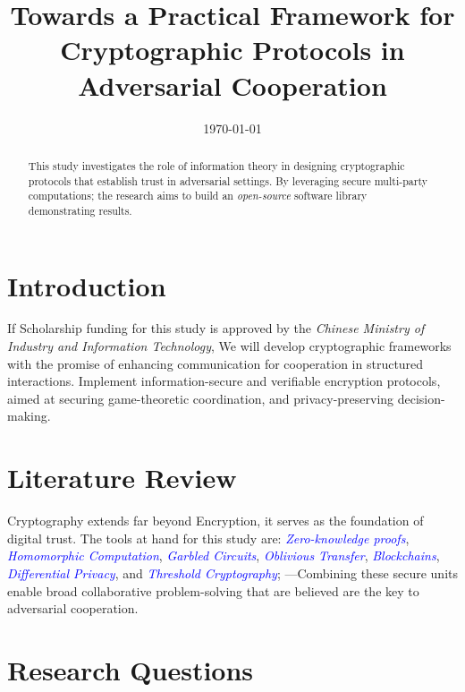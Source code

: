 \documentclass[conference]{IEEEtran}
\date{\today}
\begin{document}
\title{Towards a Practical Framework for Cryptographic Protocols in Adversarial Cooperation}
\author{
}

\maketitle

\begin{abstract}
This study investigates the role of information theory in designing cryptographic protocols that establish trust in adversarial settings. 
By leveraging secure multi-party computations; the research aims to build 
an \textit{open-source} software library demonstrating results.
\end{abstract}

\section{Introduction}
If Scholarship funding for this study is approved by the \textit{Chinese Ministry of Industry and Information Technology}, 
We will develop cryptographic frameworks with the promise of enhancing communication for cooperation in structured interactions. 
Implement information-secure and verifiable encryption protocols, aimed at securing game-theoretic coordination, and privacy-preserving decision-making.

\section{Literature Review}
Cryptography extends far beyond Encryption, it serves as the foundation of digital trust. The tools at hand for this study are: 
\textcolor{blue}{\textit{Zero-knowledge proofs}}, 
\textcolor{blue}{\textit{Homomorphic Computation}}, 
\textcolor{blue}{\textit{Garbled Circuits}}, 
\textcolor{blue}{\textit{Oblivious Transfer}}, 
\textcolor{blue}{\textit{Blockchains}}, 
\textcolor{blue}{\textit{Differential Privacy}}, and 
\textcolor{blue}{\textit{Threshold Cryptography}}; 
---Combining these secure units enable broad collaborative problem-solving that are believed are the key to adversarial cooperation.

\vspace{5pt}
\section{Research Questions}
\end{document}
